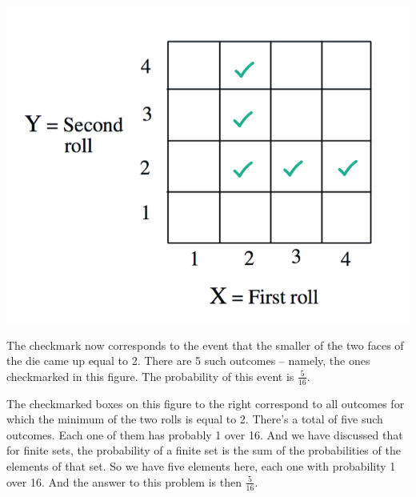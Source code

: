 \documentclass{tufte-handout}
\begin{document}
\begin{marginfigure}
  \includegraphics{CheckMarkedDie3}
  \caption{The checkmark now corresponds to the event that the smaller of the two faces of the die came up equal to 2. There are 5 such outcomes -- namely, the ones checkmarked in this figure. The probability of this event is $\frac{5}{16}.$ }
\end{marginfigure}

The checkmarked boxes on this figure to the right correspond to all outcomes for which the minimum of the two rolls is
equal to 2. There's a total of five such outcomes. Each one of them has probably 1 over 16. And we
have discussed that for finite sets, the probability of a finite set is the sum of the probabilities of the
elements of that set. So we have five elements here, each one with probability 1 over 16. And the
answer to this problem is then $\frac{5}{16}$.
\end{document}
